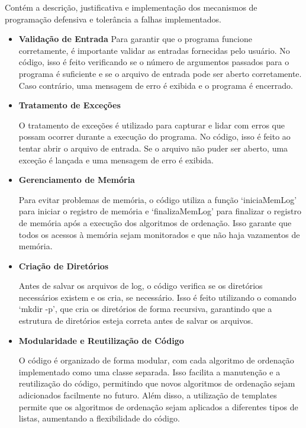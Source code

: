 \documentclass[a4paper,12pt]{article}
\begin{document}
Contém a descrição, justificativa e implementação dos mecanismos de programação defensiva e tolerância a falhas implementados.
\begin{itemize}
    \item \textbf{Validação de Entrada} Para garantir que o programa funcione corretamente, é importante validar as entradas fornecidas pelo usuário. No código, 
    isso é feito verificando se o número de argumentos passados para o programa é suficiente e se o arquivo de entrada pode ser aberto corretamente. 
    Caso contrário, uma mensagem de erro é exibida e o programa é encerrado.

    \item \textbf{Tratamento de Exceções}

    O tratamento de exceções é utilizado para capturar e lidar com erros que possam ocorrer durante a execução do programa. 
    No código, isso é feito ao tentar abrir o arquivo de entrada. Se o arquivo não puder ser aberto, uma exceção é lançada e uma mensagem de erro é exibida.

    \item \textbf{Gerenciamento de Memória}

    Para evitar problemas de memória, o código utiliza a função `iniciaMemLog' para iniciar o registro de memória e `finalizaMemLog' para finalizar 
    o registro de memória após a execução dos algoritmos de ordenação. Isso garante que todos os acessos à memória sejam monitorados e que não haja vazamentos de memória.

    \item \textbf{Criação de Diretórios}

    Antes de salvar os arquivos de log, o código verifica se os diretórios necessários existem e os cria, se necessário. 
    Isso é feito utilizando o comando `mkdir -p', que cria os diretórios de forma recursiva, garantindo que a estrutura de diretórios esteja correta antes de salvar os arquivos.

    \item \textbf{Modularidade e Reutilização de Código}

    O código é organizado de forma modular, com cada algoritmo de ordenação implementado como uma classe separada. Isso facilita a manutenção e a reutilização do código, 
    permitindo que novos algoritmos de ordenação sejam adicionados facilmente no futuro. Além disso, a utilização de templates permite que os algoritmos de ordenação sejam aplicados a diferentes tipos de listas, 
    aumentando a flexibilidade do código.

\end{itemize}
\end{document}
